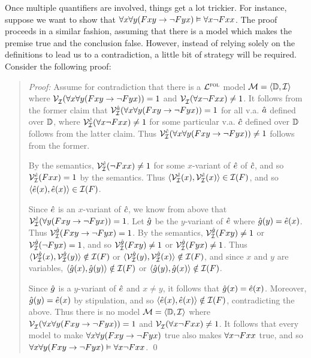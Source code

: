 Once multiple quantifiers are involved, things get a lot trickier.
For instance, suppose we want to show that $\forall x\forall y(Fxy \rightarrow \neg Fyx) \vDash \forall x\neg Fxx$.
The proof proceeds in a similar fashion, assuming that there is a model which makes the premise true and the conclusion false.
However, instead of relying solely on the definitions to lead us to a contradiction, a little bit of strategy will be required.
Consider the following proof:

\begin{quote}
\label{allmodels3}
  \textit{Proof:}
  Assume for contradiction that there is a $\mathcal{L}^{\textsc{fol}}$ model $\mathcal{M}=\langle\mathbb{D},\mathcal{I}\rangle$ where $\mathcal{V}_{\mathcal{I}}^{}(\forall x\forall y(Fxy \rightarrow \neg Fyx))=1$ and $\mathcal{V}_{\mathcal{I}}^{}(\forall x\neg Fxx)\neq 1$. 
  It follows from the former claim that $\mathcal{V}_{\mathcal{I}}^{\hat{a}}(\forall x\forall y(Fxy \rightarrow \neg Fyx))=1$ for all v.a. $\hat{a}$ defined over $\mathbb{D}$, where $\mathcal{V}_{\mathcal{I}}^{\hat{c}}(\forall x\neg Fxx)\neq 1$ for some particular v.a. $\hat{c}$ defined over $\mathbb{D}$ follows from the latter claim.
  Thus $\mathcal{V}_{\mathcal{I}}^{\hat{c}}(\forall x\forall y(Fxy \rightarrow \neg Fyx))\neq 1$ follows from the former.

  By the semantics, $\mathcal{V}_{\mathcal{I}}^{\hat{e}}(\neg Fxx)\neq 1$ for some $x$-variant of $\hat{e}$ of $\hat{c}$, and so $\mathcal{V}_{\mathcal{I}}^{\hat{e}}(Fxx)=1$ by the semantics.
  Thus $\langle\mathcal{V}_{\mathcal{I}}^{\hat{e}}(x),\mathcal{V}_{\mathcal{I}}^{\hat{e}}(x)\rangle\in\mathcal{I}(F)$, and so $\langle\hat{e}(x),\hat{e}(x)\rangle\in\mathcal{I}(F)$.

  Since $\hat{e}$ is an $x$-variant of $\hat{c}$, we know from above that $\mathcal{V}_{\mathcal{I}}^{\hat{e}}(\forall y(Fxy \rightarrow \neg Fyx))=1$.
  Let $\hat{g}$ be the $y$-variant of $\hat{e}$ where $\hat{g}(y)=\hat{e}(x)$.
  Thus $\mathcal{V}_{\mathcal{I}}^{\hat{g}}(Fxy \rightarrow \neg Fyx)=1$.
  By the semantics, $\mathcal{V}_{\mathcal{I}}^{\hat{g}}(Fxy)\neq 1$ or $\mathcal{V}_{\mathcal{I}}^{\hat{g}}(\neg Fyx)=1$, and so $\mathcal{V}_{\mathcal{I}}^{\hat{g}}(Fxy)\neq 1$ or $\mathcal{V}_{\mathcal{I}}^{\hat{g}}(Fyx)\neq 1$.
  Thus $\langle\mathcal{V}_{\mathcal{I}}^{\hat{g}}(x),\mathcal{V}_{\mathcal{I}}^{\hat{g}}(y)\rangle\notin\mathcal{I}(F)$ or $\langle\mathcal{V}_{\mathcal{I}}^{\hat{g}}(y),\mathcal{V}_{\mathcal{I}}^{\hat{g}}(x)\rangle\notin\mathcal{I}(F)$, and since $x$ and $y$ are variables, $\langle\hat{g}(x),\hat{g}(y)\rangle\notin\mathcal{I}(F)$ or $\langle\hat{g}(y),\hat{g}(x)\rangle\notin\mathcal{I}(F)$.

  Since $\hat{g}$ is a $y$-variant of $\hat{e}$ and $x\neq y$, it follows that $\hat{g}(x)=\hat{e}(x)$.
  Moreover, $\hat{g}(y)=\hat{e}(x)$ by stipulation, and so $\langle\hat{e}(x),\hat{e}(x)\rangle\notin\mathcal{I}(F)$, contradicting the above.
  Thus there is no model $\mathcal{M}=\langle\mathbb{D},\mathcal{I}\rangle$ where $\mathcal{V}_{\mathcal{I}}^{}(\forall x\forall y(Fxy \rightarrow \neg Fyx))=1$ and $\mathcal{V}_{\mathcal{I}}^{}(\forall x\neg Fxx)\neq 1$. 
  It follows that every model to make $\forall x\forall y(Fxy \rightarrow \neg Fyx)$ true also makes $\forall x\neg Fxx$ true, and so $\forall x\forall y(Fxy \rightarrow \neg Fyx) \vDash \forall x\neg Fxx$.
  \qed
\end{quote}

